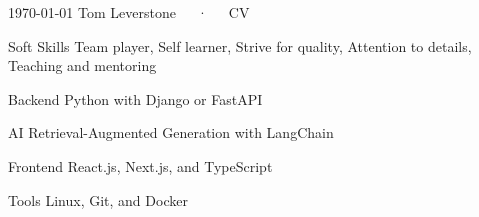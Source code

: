 \documentclass[11pt, a4paper]{awesome-cv}
\begin{document}
\makecvheader[C]

\makecvfooter
  {\today}
  {Tom Leverstone~~~·~~~CV}
  {\thepage}



\begin{cvskills}
  \cvskill
    {Soft Skills} %
    {Team player, Self learner, Strive for quality, Attention to details, Teaching and mentoring} %

  \cvskill
    {Backend} %
    {Python with Django or FastAPI} %

  \cvskill
    {AI} %
    {Retrieval-Augmented Generation with LangChain} %

  \cvskill
    {Frontend} %
    {React.js, Next.js, and TypeScript} %

  \cvskill
    {Tools} %
    {Linux, Git, and Docker} %

\end{cvskills}

\end{document}
